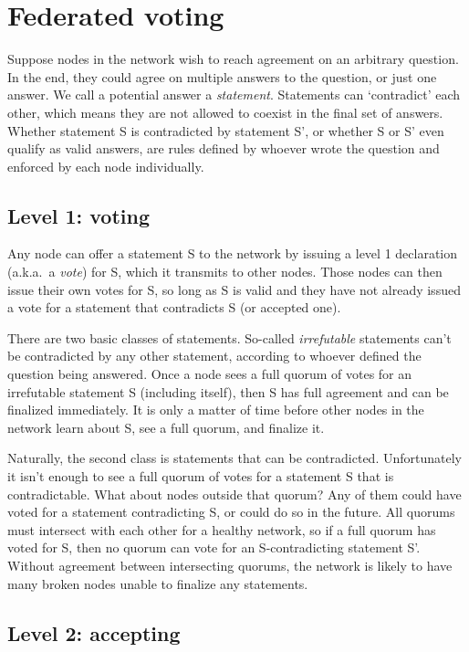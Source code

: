 \section{Federated voting}
\label{sec:consensus-federated-voting}

Suppose nodes in the network wish to reach agreement on an arbitrary question. In the end, they could agree on multiple answers to the question, or just one answer. We call a potential answer a {\em statement}. Statements can `contradict' each other, which means they are not allowed to coexist in the final set of answers. Whether statement S is contradicted by statement S', or whether S or S' even qualify as valid answers, are rules defined by whoever wrote the question and enforced by each node individually.


\subsection{Level 1: voting}
\label{subsec:consensus-lv1-voting}

Any node can offer a statement S to the network by issuing a level 1 declaration (a.k.a.\ a {\em vote}) for S, which it transmits to other nodes. Those nodes can then issue their own votes for S, so long as S is valid and they have not already issued a vote for a statement that contradicts S (or accepted one).

There are two basic classes of statements. So-called {\em irrefutable} statements can't be contradicted by any other statement, according to whoever defined the question being answered. Once a node sees a full quorum of votes for an irrefutable statement S (including itself), then S has full agreement and can be finalized immediately. It is only a matter of time before other nodes in the network learn about S, see a full quorum, and finalize it.

Naturally, the second class is statements that can be contradicted. Unfortunately it isn't enough to see a full quorum of votes for a statement S that is contradictable. What about nodes outside that quorum? Any of them could have voted for a statement contradicting S, or could do so in the future. All quorums must intersect with each other for a healthy network, so if a full quorum has voted for S, then no quorum can vote for an S-contradicting statement S'. Without agreement between intersecting quorums, the network is likely to have many broken nodes unable to finalize any statements.

\subsection{Level 2: accepting}
\label{subsec:consensus-lv2-accepting}

